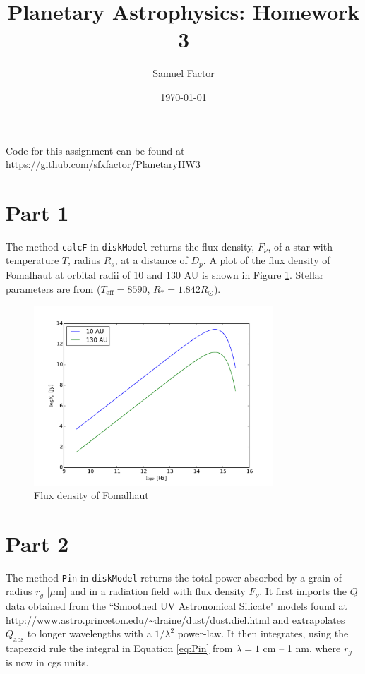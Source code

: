 \documentclass[12pt,preprint]{aastex}
\title{Planetary Astrophysics: Homework 3}
\author{Samuel Factor}
\date{\today}                                           %
\begin{document}
\maketitle
Code for this assignment can be found at \url{https://github.com/sfxfactor/PlanetaryHW3}

\section{Part 1}
The method \texttt{calcF} in \texttt{diskModel} returns the flux density, $F_\nu$, of a star with temperature $T$, radius $R_s$, at a distance of $D_p$. A plot of the flux density of Fomalhaut at orbital radii of 10 and 130 AU is shown in Figure \ref{fig:FomFnu}. Stellar parameters are from \citet{Fom} ($T_\mathrm{eff}=8590$, $R_*=1.842 R_\odot$). 

\begin{figure}[htbp]
\begin{center}
\includegraphics[width=0.8\textwidth]{FomFnu.pdf}
    \caption{Flux density of Fomalhaut}
    \label{fig:FomFnu}
\end{center}
\end{figure}

\section{Part 2}
The method \texttt{Pin} in \texttt{diskModel} returns the total power absorbed by a grain of radius $r_g$ [$\mu$m] and in a radiation field with flux density $F_\nu$. It first imports the $Q$ data obtained from the ``Smoothed UV Astronomical Silicate" models found at \url{http://www.astro.princeton.edu/~draine/dust/dust.diel.html} and extrapolates $Q_\mathrm{abs}$ to longer wavelengths with a $1/\lambda^2$ power-law. It then integrates, using the trapezoid rule the integral in Equation \ref{eq:Pin} from $\lambda=1$ cm -- 1 nm, where $r_g$ is now in cgs units.
\end{document}
